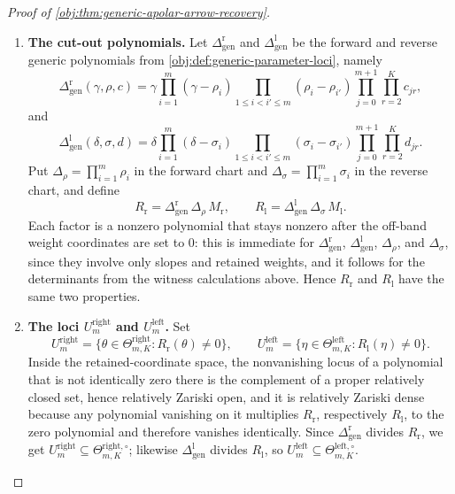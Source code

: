 \begin{proof}[Proof of \cref{obj:thm:generic-apolar-arrow-recovery}]
\begin{enumerate}
\item \textbf{The cut-out polynomials.}  Let \(\Delta_{\mathrm{gen}}^{\mathrm r}\) and \(\Delta_{\mathrm{gen}}^{\mathrm l}\) be the forward and reverse generic polynomials from \cref{obj:def:generic-parameter-loci}, namely
\[
\Delta_{\mathrm{gen}}^{\mathrm r}(\gamma,\rho,c)
=\gamma\prod_{i=1}^m(\gamma-\rho_i)\prod_{1\le i<i'\le m}(\rho_i-\rho_{i'})
\prod_{j=0}^{m+1}\prod_{r=2}^{K}c_{jr},
\]
and
\[
\Delta_{\mathrm{gen}}^{\mathrm l}(\delta,\sigma,d)
=\delta\prod_{i=1}^m(\delta-\sigma_i)\prod_{1\le i<i'\le m}(\sigma_i-\sigma_{i'})
\prod_{j=0}^{m+1}\prod_{r=2}^{K}d_{jr}.
\]
Put \(\Delta_\rho=\prod_{i=1}^m\rho_i\) in the forward chart and \(\Delta_\sigma=\prod_{i=1}^m\sigma_i\) in the reverse chart, and define
\[
R_{\mathrm r}=\Delta_{\mathrm{gen}}^{\mathrm r}\,\Delta_\rho\,M_{\mathrm r},
\qquad
R_{\mathrm l}=\Delta_{\mathrm{gen}}^{\mathrm l}\,\Delta_\sigma\,M_{\mathrm l}.
\]
Each factor is a nonzero polynomial that stays nonzero after the off-band weight coordinates are set to \(0\): this is immediate for \(\Delta_{\mathrm{gen}}^{\mathrm r}\), \(\Delta_{\mathrm{gen}}^{\mathrm l}\), \(\Delta_\rho\), and \(\Delta_\sigma\), since they involve only slopes and retained weights, and it follows for the determinants from the witness calculations above.  Hence \(R_{\mathrm r}\) and \(R_{\mathrm l}\) have the same two properties.

\item \textbf{The loci \(U^{\mathrm{right}}_m\) and \(U^{\mathrm{left}}_m\).}  Set
\[
U^{\mathrm{right}}_m=\bigl\{\theta\in\Theta^{\mathrm{right}}_{m,K}:R_{\mathrm r}(\theta)\ne0\bigr\},
\qquad
U^{\mathrm{left}}_m=\bigl\{\eta\in\Theta^{\mathrm{left}}_{m,K}:R_{\mathrm l}(\eta)\ne0\bigr\}.
\]
Inside the retained-coordinate space, the nonvanishing locus of a polynomial that is not identically zero there is the complement of a proper relatively closed set, hence relatively Zariski open, and it is relatively Zariski dense because any polynomial vanishing on it multiplies \(R_{\mathrm r}\), respectively \(R_{\mathrm l}\), to the zero polynomial and therefore vanishes identically.  Since \(\Delta_{\mathrm{gen}}^{\mathrm r}\) divides \(R_{\mathrm r}\), we get \(U^{\mathrm{right}}_m\subseteq\Theta^{\mathrm{right},\circ}_{m,K}\); likewise \(\Delta_{\mathrm{gen}}^{\mathrm l}\) divides \(R_{\mathrm l}\), so \(U^{\mathrm{left}}_m\subseteq\Theta^{\mathrm{left},\circ}_{m,K}\).


\end{enumerate}
\end{proof}
